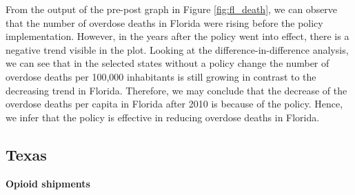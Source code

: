 \documentclass[12pt,letterpaper]{article}
\begin{document}
From the output of the pre-post graph in Figure \ref{fig:fl_death}, we can observe that the number of overdose deaths in Florida were rising before the policy implementation. However, in the years after the policy went into effect, there is a negative trend visible in the plot. Looking at the difference-in-difference analysis, we can see that in the selected states without a policy change the number of overdose deaths per 100,000 inhabitants is still growing in contrast to the decreasing trend in Florida.  Therefore, we may conclude that the decrease of the overdose deaths per capita in Florida after 2010 is because of the policy. Hence, we infer that the policy is effective in reducing overdose deaths in Florida.

\subsection{Texas}
\textbf{Opioid shipments}
\end{document}
